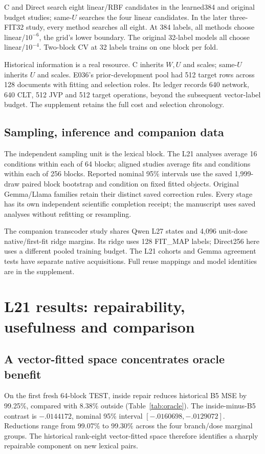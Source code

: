 \documentclass[11pt]{article}
\begin{document}
C and Direct search eight linear/RBF candidates in the learned384 and original budget studies; same-$U$ searches the four linear candidates. In the later three-FIT32 study, every method searches all eight. At 384 labels, all methods choose linear/$10^{-6}$, the grid's lower boundary. The original 32-label models all choose linear/$10^{-4}$. Two-block CV at 32 labels trains on one block per fold.

Historical information is a real resource. C inherits $W,U$ and scales; same-$U$ inherits $U$ and scales. E036's prior-development pool had 512 target rows across 128 documents with fitting and selection roles. Its ledger records 640 network, 640 CLT, 512 JVP and 512 target operations, beyond the subsequent vector-label budget. The supplement retains the full cost and selection chronology.

\subsection{Sampling, inference and companion data}
The independent sampling unit is the lexical block. The L21 analyses average 16 conditions within each of 64 blocks; aligned studies average fits and conditions within each of 256 blocks. Reported nominal 95\% intervals use the saved 1,999-draw paired block bootstrap and condition on fixed fitted objects. Original Gemma/Llama families retain their distinct saved correction rules. Every stage has its own independent scientific completion receipt; the manuscript uses saved analyses without refitting or resampling.

The companion transcoder study shares Qwen L27 states and 4,096 unit-dose native/first-fit ridge margins. Its ridge uses 128 FIT\_MAP labels; Direct256 here uses a different pooled training budget. The L21 cohorts and Gemma agreement tests have separate native acquisitions. Full reuse mappings and model identities are in the supplement.

\section{L21 results: repairability, usefulness and comparison}
\subsection{A vector-fitted space concentrates oracle benefit}
On the first fresh 64-block TEST, inside repair reduces historical B5 MSE by 99.25\%, compared with 8.38\% outside (Table~\ref{tab:oracle}). The inside-minus-B5 contrast is $-.0144172$, nominal 95\% interval $[-.0160698,-.0129072]$. Reductions range from 99.07\% to 99.30\% across the four branch/dose marginal groups. The historical rank-eight vector-fitted space therefore identifies a sharply repairable component on new lexical pairs.
\end{document}
